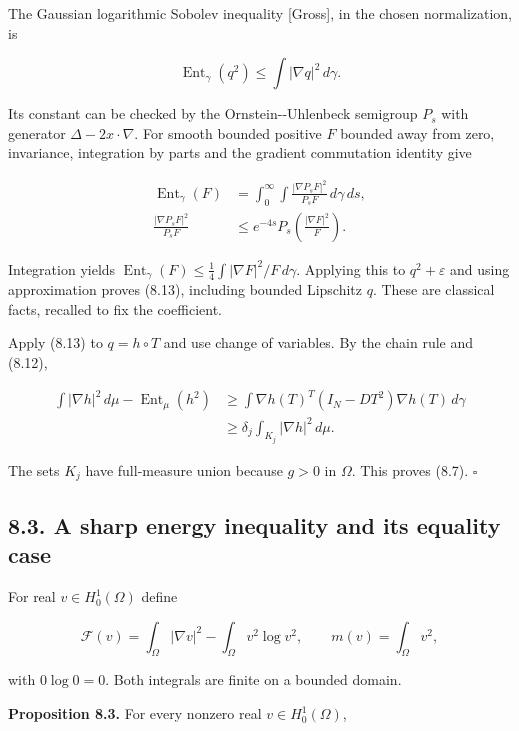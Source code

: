 \documentclass[11pt]{article}
\begin{document}
The Gaussian logarithmic Sobolev inequality {[}Gross{]}, in the chosen
normalization, is

\[\operatorname{Ent}_\gamma(q^2)\leq\int|\nabla q|^2\,d\gamma.\tag{8.13}\]

Its constant can be checked by the Ornstein-\/-Uhlenbeck semigroup
\(P_s\) with generator \(\Delta-2x\cdot\nabla\). For smooth bounded
positive \(F\) bounded away from zero, invariance, integration by parts
and the gradient commutation identity give

\[\begin{aligned}
\operatorname{Ent}_\gamma(F)&=\int_0^\infty\int
\frac{|\nabla P_sF|^2}{P_sF}\,d\gamma\,ds,\\
\frac{|\nabla P_sF|^2}{P_sF}&\leq e^{-4s}P_s\!\left(\frac{|\nabla F|^2}{F}\right).
\end{aligned}\]

Integration yields
\(\operatorname{Ent}_\gamma(F)\leq\frac14\int|\nabla F|^2/F\,d\gamma\).
Applying this to \(q^2+\varepsilon\) and using approximation proves
(8.13), including bounded Lipschitz \(q\). These are classical facts,
recalled to fix the coefficient.

Apply (8.13) to \(q=h\circ T\) and use change of variables. By the chain
rule and (8.12),

\[\begin{aligned}
\int|\nabla h|^2\,d\mu-\operatorname{Ent}_\mu(h^2)
&\geq\int \nabla h(T)^T(I_N-DT^2)\nabla h(T)\,d\gamma\\
&\geq\delta_j\int_{K_j}|\nabla h|^2\,d\mu.
\end{aligned}\]

The sets \(K_j\) have full-measure union because \(g>0\) in \(\Omega\).
This proves (8.7). \(\square\)

\subsection{8.3. A sharp energy inequality and its equality
case}\label{a-sharp-energy-inequality-and-its-equality-case}

For real \(v\in H^1_0(\Omega)\) define

\[\mathcal F(v)=\int_\Omega|\nabla v|^2-\int_\Omega v^2\log v^2,
\qquad m(v)=\int_\Omega v^2,\tag{8.14}\]

with \(0\log0=0\). Both integrals are finite on a bounded domain.

\textbf{Proposition 8.3.} For every nonzero real \(v\in H^1_0(\Omega)\),
\end{document}
